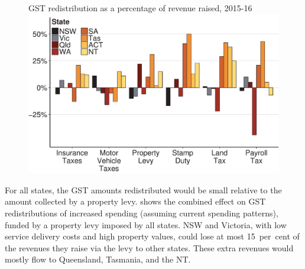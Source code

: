 \documentclass[twoside,english]{Dianab5ona4portrait}
\begin{document}
\begin{figure}
%
{GST redistribution as a percentage of revenue raised, 2015-16}
\includegraphics[width=1.0\columnwidth]{Property-taxes/atlas/figure/Figure6-1.pdf}

\end{figure}

For all states, the GST amounts redistributed would be small relative to the amount collected by a property levy.  shows the combined effect on GST redistributions of increased spending (assuming current spending patterns), funded by a property levy imposed by all states. NSW and Victoria, with low service delivery costs and high property values, could lose at most 15~per~cent of the revenues they raise via the levy to other states. These extra revenues would mostly flow to Queensland, Tasmania, and the NT\@.
\end{document}
